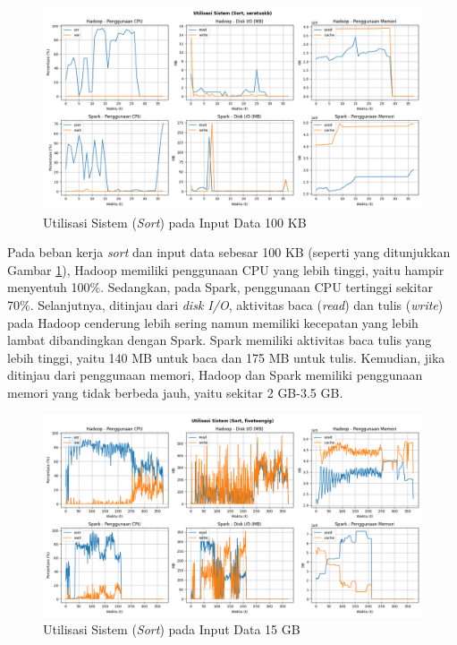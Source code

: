 \begin{figure}[h]
    \centering
    \includegraphics[width=1\textwidth]{figures/ch04/5-util-sistem-sort-seratuskb}
    \caption{Utilisasi Sistem (\textit{Sort}) pada Input Data 100 KB}
    \label{fig:5-util-sistem-sort-seratuskb}
\end{figure}

Pada beban kerja \textit{sort} dan input data sebesar 100 KB (seperti yang ditunjukkan Gambar \ref{fig:5-util-sistem-sort-seratuskb}), Hadoop memiliki penggunaan CPU yang lebih tinggi, yaitu hampir menyentuh 100\%. Sedangkan, pada Spark, penggunaan CPU tertinggi sekitar 70\%. Selanjutnya, ditinjau dari \textit{disk I/O}, aktivitas baca (\textit{read}) dan tulis (\textit{write}) pada Hadoop cenderung lebih sering namun memiliki kecepatan yang lebih lambat dibandingkan dengan Spark. Spark memiliki aktivitas baca tulis yang lebih tinggi, yaitu 140 MB untuk baca dan 175 MB untuk tulis. Kemudian, jika ditinjau dari penggunaan memori, Hadoop dan Spark memiliki penggunaan memori yang tidak berbeda jauh, yaitu sekitar 2 GB-3.5 GB.

\begin{figure}[h]
    \centering
    \includegraphics[width=1\textwidth]{figures/ch04/5-util-sistem-sort-fiveteengig}
    \caption{Utilisasi Sistem (\textit{Sort}) pada Input Data 15 GB}
    \label{fig:5-util-sistem-sort-fiveteengig}
\end{figure}

